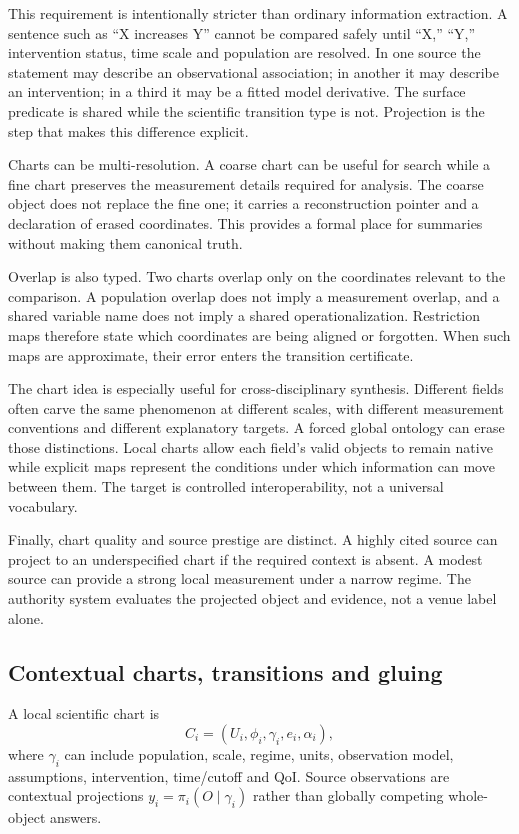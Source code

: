 This requirement is intentionally stricter than ordinary information extraction. A sentence such as ``X increases Y'' cannot be compared safely until ``X,'' ``Y,'' intervention status, time scale and population are resolved. In one source the statement may describe an observational association; in another it may describe an intervention; in a third it may be a fitted model derivative. The surface predicate is shared while the scientific transition type is not. Projection is the step that makes this difference explicit.

Charts can be multi-resolution. A coarse chart can be useful for search while a fine chart preserves the measurement details required for analysis. The coarse object does not replace the fine one; it carries a reconstruction pointer and a declaration of erased coordinates. This provides a formal place for summaries without making them canonical truth.

Overlap is also typed. Two charts overlap only on the coordinates relevant to the comparison. A population overlap does not imply a measurement overlap, and a shared variable name does not imply a shared operationalization. Restriction maps therefore state which coordinates are being aligned or forgotten. When such maps are approximate, their error enters the transition certificate.

The chart idea is especially useful for cross-disciplinary synthesis. Different fields often carve the same phenomenon at different scales, with different measurement conventions and different explanatory targets. A forced global ontology can erase those distinctions. Local charts allow each field's valid objects to remain native while explicit maps represent the conditions under which information can move between them. The target is controlled interoperability, not a universal vocabulary.

Finally, chart quality and source prestige are distinct. A highly cited source can project to an underspecified chart if the required context is absent. A modest source can provide a strong local measurement under a narrow regime. The authority system evaluates the projected object and evidence, not a venue label alone.

\subsection{Contextual charts, transitions and gluing}
A local scientific chart is
\begin{equation}C_i=(U_i,\phi_i,\gamma_i,e_i,\alpha_i),\end{equation}
where $\gamma_i$ can include population, scale, regime, units, observation model, assumptions, intervention, time/cutoff and QoI. Source observations are contextual projections $y_i=\pi_i(O\mid\gamma_i)$ rather than globally competing whole-object answers.

